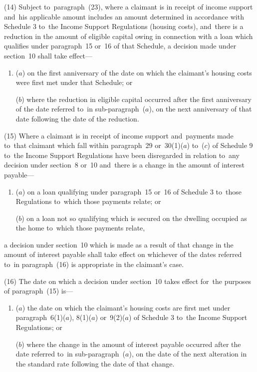 \documentclass[12pt,a4paper]{article}
\begin{document}
(14) Subject to~paragraph~(23), where a claimant is in receipt of income support and~his applicable amount includes an amount determined in accordance with Schedule 3 to~the Income Support Regulations (housing costs), and~there is a reduction in the amount of eligible capital owing in connection with a loan which qualifies under paragraph~15 or~16 of that Schedule, a decision made under section~10 shall take effect—
\begin{enumerate}\item[]
($a$) on the first anniversary of the date on which the claimant’s housing costs were first met under that Schedule; or

($b$) where the reduction in eligible capital occurred after the first anniversary of the date referred to~in sub-paragraph~($a$), on the next anniversary of that date following the date of the reduction.
\end{enumerate}

(15) Where a claimant is in receipt of income support and~payments made to~that claimant which fall within paragraph~29 or~30(1)($a$) to~($c$) of Schedule 9 to~the Income Support Regulations have been disregarded in relation to~any decision under section~8 or~10 and~there is a change in the amount of interest payable—
\begin{enumerate}\item[]
($a$) on a loan qualifying under paragraph~15 or~16 of Schedule 3 to~those Regulations to~which those payments relate; or

($b$) on a loan not so qualifying which is secured on the dwelling occupied as the home to~which those payments relate,
\end{enumerate}
a decision under section~10 which is made as a result of that change in the amount of interest payable shall take effect on whichever of the dates referred to~in paragraph~(16) is appropriate in the claimant’s case.

(16) The date on which a decision under section~10 takes effect for~the purposes of paragraph~(15) is—
\begin{enumerate}\item[]
($a$) the date on which the claimant’s housing costs are first met under paragraph~6(1)($a$), 8(1)($a$) or~9(2)($a$) of Schedule 3 to~the Income Support Regulations; or

($b$) where the change in the amount of interest payable occurred after the date referred to~in sub-paragraph~($a$), on the date of the next alteration in the standard rate following the date of that change.
\end{enumerate}
\end{document}
